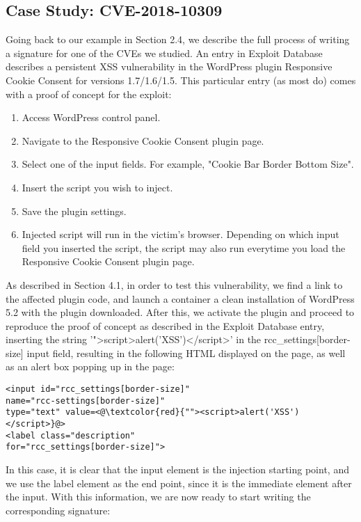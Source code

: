 \subsection{Case Study: CVE-2018-10309}
Going back to our example in Section 2.4, we describe the full process of writing a signature for one of the CVEs we studied. An entry in Exploit Database \cite{studyCVE} describes a persistent XSS vulnerability in the WordPress plugin Responsive Cookie Consent for versions 1.7/1.6/1.5. This particular entry (as most do) comes with a proof of concept for the exploit: 
\begin{enumerate}
\item Access WordPress control panel.
\item Navigate to the Responsive Cookie Consent plugin page.
\item Select one of the input fields. For example, "Cookie Bar Border Bottom Size".
\item Insert the script you wish to inject.
\item Save the plugin settings.
\item Injected script will run in the victim's browser. Depending on which input field you inserted the script, the script may also run everytime you load the Responsive Cookie Consent plugin page.
	
\end{enumerate}

 As described in Section 4.1, in order to test this vulnerability, we find a link to the affected plugin code, and launch a container a clean installation of WordPress 5.2 with the plugin downloaded. After this, we activate the plugin and proceed to reproduce the proof of concept as described in the Exploit Database entry, inserting the string '">script>alert('XSS')</script>' in the rcc\_settings[border-size] input field, resulting in the following HTML displayed on the page, as well as an alert box popping up in the page:

\begin{lstlisting}
<input id="rcc_settings[border-size]" 
name="rcc-settings[border-size]" 
type="text" value=<@\textcolor{red}{""><script>alert('XSS')</script>}@>
<label class="description"
for="rcc_settings[border-size]">
\end{lstlisting}

In this case, it is clear that the input element is the injection starting point, and we use the label element as the end point, since it is the immediate element after the input. With this information, we are now ready to start writing the corresponding signature:

